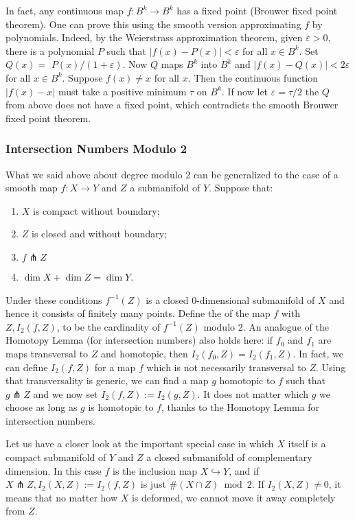 \documentclass[a4paper, 10pt, twocolumn]{amsart}
\begin{document}
In fact, any continuous map $f: B^{k} \rightarrow B^{k}$ has a fixed point (Brouwer fixed point theorem). One can prove this using the smooth version approximating $f$ by polynomials. Indeed, by the Weierstrass approximation theorem, given $\varepsilon>0$, there is a polynomial $P$ such that $|f(x)-P(x)|<\varepsilon$ for all $x \in B^{k}$. Set $Q(x)=$ $P(x) /(1+\varepsilon)$. Now $Q$ maps $B^{k}$ into $B^{k}$ and $|f(x)-Q(x)|<2 \varepsilon$ for all $x \in B^{k}$. Suppose $f(x) \neq x$ for all $x$. Then the continuous function $|f(x)-x|$ must take a positive minimum $\tau$ on $B^{k}$. If now let $\varepsilon=\tau / 2$ the $Q$ from above does not have a fixed point, which contradicts the smooth Brouwer fixed point theorem.

\subsubsection{Intersection Numbers Modulo 2}

What we said above about degree modulo 2 can be generalized to the case of a smooth map $f: X \rightarrow Y$ and $Z$ a submanifold of $Y$. Suppose that:
\begin{enumerate}
    \item $X$ is compact without boundary;
    \item $Z$ is closed and without boundary;
    \item $f \pitchfork Z$
    \item $\operatorname{dim} X+\operatorname{dim} Z=\operatorname{dim} Y$.
\end{enumerate}
Under these conditions $f^{-1}(Z)$ is a closed 0-dimensional submanifold of $X$ and hence it consists of finitely many points. Define the  of the map $f$ with $Z, I_{2}(f, Z)$, to be the cardinality of $f^{-1}(Z)$ modulo 2. An analogue of the Homotopy Lemma (for intersection numbers) also holds here: if $f_{0}$ and $f_{1}$ are maps transversal to $Z$ and homotopic, then $I_{2}\left(f_{0}, Z\right)=I_{2}\left(f_{1}, Z\right)$. In fact, we can define $I_{2}(f, Z)$ for a map $f$ which is not necessarily transversal to $Z$. Using that transversality is generic, we can find a map $g$ homotopic to $f$ such that $g \pitchfork Z$ and we now set $I_{2}(f, Z):=I_{2}(g, Z)$. It does not matter which $g$ we choose as long as $g$ is homotopic to $f$, thanks to the Homotopy Lemma for intersection numbers.

Let us have a closer look at the important special case in which $X$ itself is a compact submanifold of $Y$ and $Z$ a closed submanifold of complementary dimension. In this case $f$ is the inclusion map $X \hookrightarrow Y$, and if $X \pitchfork Z, I_{2}(X, Z):=I_{2}(f, Z)$ is just $\#(X \cap Z) \bmod 2$. If $I_{2}(X, Z) \neq 0$, it means that no matter how $X$ is deformed, we cannot move it away completely from $Z$.
\end{document}
